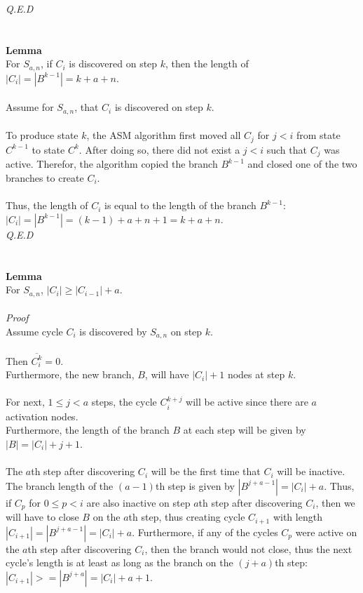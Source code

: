\documentclass[a4paper,12pt]{article}
\begin{document}
\textit{Q.E.D}\\
\\
\\
\textbf{Lemma}\\
For $S_{a,n}$, if $C_i$ is discovered on step $k$, then the length of $|C_i| = |B^{k-1}| = k + a + n$.\\
\\
Assume for $S_{a,n}$, that $C_i$ is discovered on step $k$.\\
\\
To produce state $k$, the ASM algorithm first moved all $C_j$ for $j < i$ from state $C^{k-1}$ to state $C^k$. After doing so, there did not exist a $j < i$ such that $C_j$ was active. Therefor, the algorithm copied the branch $B^{k-1}$ and closed one of the two branches to create $C_i$.\\
\\ 
Thus, the length of $C_i$ is equal to the length of the branch $B^{k-1}$:\\ $|C_i| = |B^{k-1}| = (k - 1) + a + n + 1 = k + a + n$.\\
\textit{Q.E.D}\\
\\
\\
\textbf{Lemma}\\
For $S_{a,n}$, $|C_{i}| \geq |C_{i-1}| + a$.\\
\\
\textit{Proof}\\  
Assume cycle $C_i$ is discovered by $S_{a,n}$ on step $k$.\\
\\
Then $\overline{C^k_i} = 0$.\\
Furthermore, the new branch, $B$, will have $|C_i| + 1$ nodes at step $k$.\\
\\
For next, $1 \leq j < a$ steps, the cycle  $C^{k+j}_i$ will be active since there are $a$ activation nodes.\\
Furthermore, the length of the branch $B$ at each step will be given by $|B| = |C_i| + j + 1$.\\
\\
The $a$th step after discovering $C_i$ will be the first time that $C_i$ will be inactive. The branch length of the $(a-1)$th step is given by $|B^{j + a - 1}| = |C_i| + a$. Thus, if $C_p$ for $0 \leq p < i$ are also inactive on step $a$th step after discovering $C_i$, then we will have to close $B$ on the $a$th step, thus creating cycle $C_{i+1}$ with length $|C_{i+1}| = |B^{j + a - 1}| = |C_i| + a$. Furthermore, if any of the cycles $C_p$ were active on the $a$th step after discovering $C_i$, then the branch would not close, thus the next cycle's length is at least as long as the branch on the $(j+a)$th step: $|C_{i+1}| >= |B^{j + a}| = |C_i| + a + 1$.\\
\end{document}
